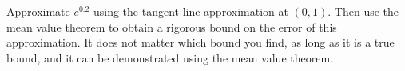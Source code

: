 \documentclass{ximera}
\author{Steven Gubkin}
\begin{document}
\begin{exercise}



Approximate $e^{0.2}$ using the tangent line approximation at $(0,1)$.
Then use the mean value theorem to obtain a rigorous bound on the
error of this approximation.  It does not matter which bound you find,
as long as it is a true bound, and it can be demonstrated using the
mean value theorem.

\end{exercise}
\end{document}
